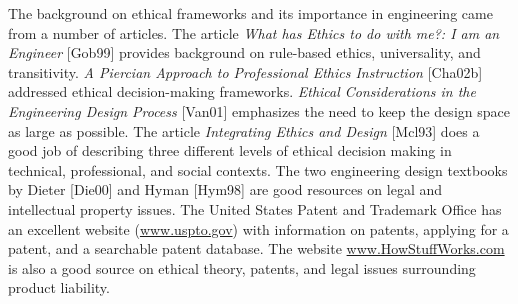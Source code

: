 The background on ethical frameworks and its importance in engineering
came from a number of articles. The article \emph{What has Ethics to do
with me?: I am an Engineer} {[}Gob99{]} provides background on
rule-based ethics, universality, and transitivity. \emph{A Piercian
Approach to Professional Ethics Instruction} {[}Cha02b{]} addressed
ethical decision-making frameworks. \emph{Ethical Considerations in the
Engineering Design Process} {[}Van01{]} emphasizes the need to keep the
design space as large as possible. The article \emph{Integrating Ethics
and Design} {[}Mcl93{]} does a good job of describing three different
levels of ethical decision making in technical, professional, and social
contexts. The two engineering design textbooks by Dieter {[}Die00{]} and
Hyman {[}Hym98{]} are good resources on legal and intellectual property
issues. The United States Patent and Trademark Office has an excellent
website (\href{http://www.uspto.gov}{www.uspto.gov}) with information on
patents, applying for a patent, and a searchable patent database. The
website \href{http://www.HowStuffWorks.com}{www.HowStuffWorks.com} is
also a good source on ethical theory, patents, and legal issues
surrounding product liability.
